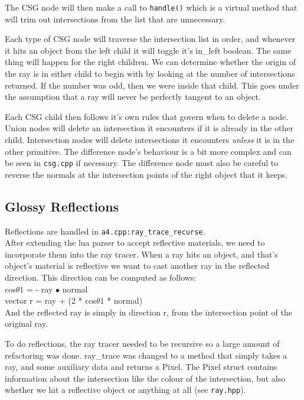 \documentclass {article}
\begin{document}
The CSG node will then make a call to \verb!handle()! which is a virtual method
that will trim out intersections from the list that are unnecessary.

Each type of CSG node will traverse the intersection list in order, and whenever
it hits an object from the left child it will toggle it's in\_left boolean.  The
same thing will happen for the right children.  We can determine whether the
origin of the ray is in either child to begin with by looking at the number of
intersections returned.  If the number was odd, then we were inside that child.
This goes under the assumption that a ray will never be perfectly tangent to an
object.

Each CSG child then follows it's own rules that govern when to delete a node.
Union nodes will delete an intersection it encounters if it is already in
the other child.  Intersection nodes will delete intersections it encounters
\textit{unless} it is in the other primitive.  The difference node's behaviour
is a bit more complex and can be seen in \verb!csg.cpp! if necessary.  The
difference node must also be careful to reverse the normals at the intersection
points of the right object that it keeps.


\subsection{Glossy Reflections}
Reflections are handled in \verb!a4.cpp:ray_trace_recurse!.\\

After extending the lua parser to accept reflective materials, we need to
incorporate them into the ray tracer.  When a ray hits an object, and that's
object's material is reflective we want to cast another ray in the reflected
direction.  This direction can be computed as follows:\\
cos$\theta1$ = - ray $\bullet$ normal\\
vector r = ray + (2 * cos$\theta1$ * normal)\\
And the reflected ray is simply in direction r, from the intersection point of
the original ray.

To do reflections, the ray tracer needed to be recursive so a large amount of
refactoring was done.  ray\_trace was changed to a method that simply takes a
ray, and some auxiliary data and returns a Pixel.  The Pixel struct contains
information about the intersection like the colour of the intersection, but also
whether we hit a reflective object or anything at all (see \verb!ray.hpp!).\\
\end{document}

